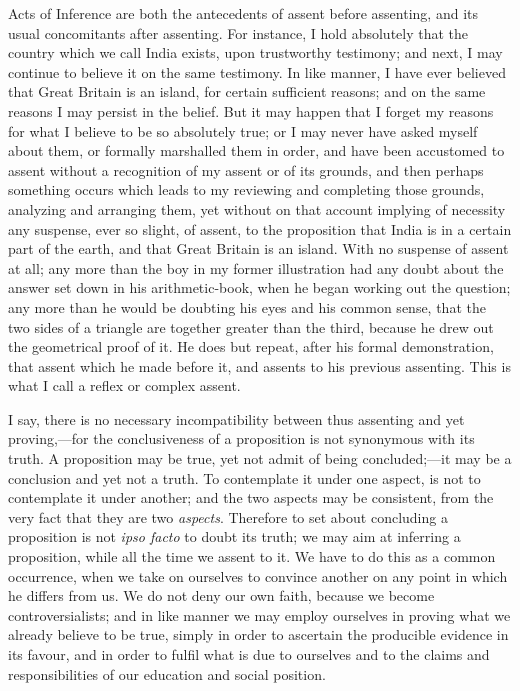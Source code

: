 Acts of Inference are both the antecedents of assent before
assenting, and its usual concomitants after assenting. For instance, I
hold absolutely that the country which we call India exists, upon
trustworthy testimony; and next, I may continue to believe it on the
same testimony. In like manner, I have ever believed that Great
Britain is an island, for certain sufficient reasons; and on the same
reasons I may persist in the belief. But it may happen that I forget
my reasons for what I believe to be so absolutely true; or I may never
have asked myself about them, or formally marshalled them in order,
and have been accustomed to assent without a recognition of my assent
or of its grounds, and then perhaps something occurs which leads to my
reviewing and completing those grounds, analyzing and arranging them,
yet without on that account implying of necessity any suspense,
ever so slight, of assent, to the proposition that India is in a
certain part of the earth, and that Great Britain is an island. With
no suspense of assent at all; any more than the boy in my former
illustration had any doubt about the answer set down in his
arithmetic-book, when he began working out the question; any more than
he would be doubting his eyes and his common sense, that the two sides
of a triangle are together greater than the third, because he drew out
the geometrical proof of it. He does but repeat, after his formal
demonstration, that assent which he made before it, and assents to his
previous assenting. This is what I call a reflex or complex assent.

I say, there is no necessary incompatibility between thus assenting
and yet proving,—for the conclusiveness of a proposition is not
synonymous with its truth. A proposition may be true, yet not admit of
being concluded;—it may be a conclusion and yet not a truth. To
contemplate it under one aspect, is not to contemplate it under
another; and the two aspects may be consistent, from the very fact
that they are two \emph{aspects}. Therefore to set about concluding a
proposition is not \emph{ipso facto} to doubt its truth; we may aim at
inferring a proposition, while all the time we assent to it. We have
to do this as a common occurrence, when we take on ourselves to
convince another on any point in which he differs from us. We do not
deny our own faith, because we become controversialists; and in like
manner we may employ ourselves in proving what we already believe to
be true, simply in order to ascertain the producible evidence in
its favour, and in order to fulfil what is due to ourselves and to the
claims and responsibilities of our education and social position.

